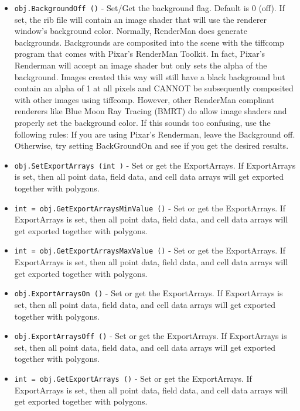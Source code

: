 \begin{itemize}
\item  \verb|obj.BackgroundOff ()| -  Set/Get the background flag. Default is 0 (off).
 If set, the rib file will contain an
 image shader that will use the renderer window's background
 color. Normally, RenderMan does generate backgrounds. Backgrounds are
 composited into the scene with the tiffcomp program that comes with
 Pixar's RenderMan Toolkit.  In fact, Pixar's Renderman will accept an
 image shader but only sets the alpha of the background. Images created
 this way will still have a black background but contain an alpha of 1
 at all pixels and CANNOT be subsequently composited with other images
 using tiffcomp.  However, other RenderMan compliant renderers like
 Blue Moon Ray Tracing (BMRT) do allow image shaders and properly set
 the background color. If this sounds too confusing, use the following
 rules: If you are using Pixar's Renderman, leave the Background
 off. Otherwise, try setting BackGroundOn and see if you get the
 desired results.

\item  \verb|obj.SetExportArrays (int )| -  Set or get the ExportArrays. If ExportArrays is set, then
 all point data, field data, and cell data arrays will get 
 exported together with polygons.

\item  \verb|int = obj.GetExportArraysMinValue ()| -  Set or get the ExportArrays. If ExportArrays is set, then
 all point data, field data, and cell data arrays will get 
 exported together with polygons.

\item  \verb|int = obj.GetExportArraysMaxValue ()| -  Set or get the ExportArrays. If ExportArrays is set, then
 all point data, field data, and cell data arrays will get 
 exported together with polygons.

\item  \verb|obj.ExportArraysOn ()| -  Set or get the ExportArrays. If ExportArrays is set, then
 all point data, field data, and cell data arrays will get 
 exported together with polygons.

\item  \verb|obj.ExportArraysOff ()| -  Set or get the ExportArrays. If ExportArrays is set, then
 all point data, field data, and cell data arrays will get 
 exported together with polygons.

\item  \verb|int = obj.GetExportArrays ()| -  Set or get the ExportArrays. If ExportArrays is set, then
 all point data, field data, and cell data arrays will get 
 exported together with polygons.

\end{itemize}
